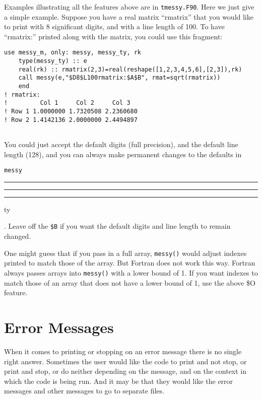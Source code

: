 \documentclass[12pt]{article}
\DeclareRobustCommand{\us}{\rule{.2pt}{0pt}\rule[-.8pt]{.4em}{.5pt}%
  \rule{.2pt}{0pt}}
\DeclareRobustCommand{\us}{\rule{.2pt}{0pt}\rule[-.8pt]{.4em}{.5pt}%
  \rule{.2pt}{0pt}}
\begin{document}
Examples illustrating all the features above are in {\tt tmessy.F90}.
Here we just give a simple example.  Suppose you have a real
matrix ``rmatrix'' that you would like to print with 8 significant digits, and
with a line length of 100.  To have ``rmatrix:'' printed along with the matrix,
you could use this fragment:
\newpage
\begin{lstlisting}[frame=single, caption={Use of {\tt messy()} to print eight
digits of a real matrix} ]
 use messy_m, only: messy, messy_ty, rk
    type(messy_ty) :: e
    real(rk) :: rmatrix(2,3)=real(reshape([1,2,3,4,5,6],[2,3]),rk)
    call messy(e,"$D8$L100rmatrix:$A$B", rmat=sqrt(rmatrix))
    end
! rmatrix:
!         Col 1     Col 2     Col 3
! Row 1 1.0000000 1.7320508 2.2360680
! Row 2 1.4142136 2.0000000 2.4494897


\end{lstlisting}

You could just accept the default digits (full precision), and the
default line length (128), and you can always make permanent changes to the
defaults in {\tt messy\us ty}.  Leave off the
\verb:$B: if you want the default digits and line length to remain changed.

One might guess that if you pass in a full array, {\tt messy()} would adjust
indexes printed to match those of the array.  But Fortran does not work this
way.  Fortran always passes arrays into {\tt messy()} with a lower bound of 1.
If you want indexes to match those of an array that does not have a lower bound
of 1, use the above \$O feature.

\section{Error Messages}
\label{sec:error-messages}
When it comes to printing or stopping on an error message there is no single
right answer.  Sometimes the user would like the code to print and not stop, or
print and stop, or do neither depending on the message, and on the context in
which the code is being run.  And it may be that they would like the error
messages and other messages to go to separate files.
\end{document}
